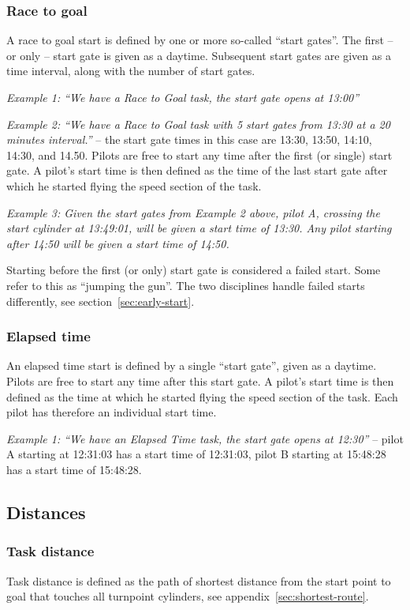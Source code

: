 \documentclass{article}
\begin{document}
\subsubsection{Race to goal}
A race to goal start is defined by one or more so-called “start gates”. The
first – or only – start gate is given as a daytime. Subsequent start gates are
given as a time interval, along with the number of start gates.

\textit{Example 1: “We have a Race to Goal task, the start gate opens at 13:00”}

\textit{Example 2: “We have a Race to Goal task with 5 start gates from 13:30 at a 20
minutes interval.”} – the start gate times in this case are 13:30, 13:50, 14:10,
14:30, and 14.50.  Pilots are free to start any time after the first (or
single) start gate. A pilot’s start time is then defined as the time of the
last start gate after which he started flying the speed section of the task.

\textit{Example 3: Given the start gates from Example 2 above, pilot A, crossing the
start cylinder at 13:49:01, will be given a start time of 13:30. Any pilot
starting after 14:50 will be given a start time of 14:50.}

Starting before the first (or only) start gate is considered a failed start.
Some refer to this as “jumping the gun”. The two disciplines handle failed
starts differently, see section~\ref{sec:early-start}.

\subsubsection{Elapsed time}
An elapsed time start is defined by a single “start gate”, given as a daytime.
Pilots are free to start any time after this start gate. A pilot’s start time
is then defined as the time at which he started flying the speed section of the
task. Each pilot has therefore an individual start time.

\textit{Example 1: “We have an Elapsed Time task, the start gate opens at 12:30”}
– pilot A starting at 12:31:03 has a start time of 12:31:03, pilot B starting
at 15:48:28 has a start time of 15:48:28.

\subsection{Distances}
\subsubsection{Task distance}
\label{sec:task-distance}
Task distance is defined as the path of shortest distance from the start point
to goal that touches all turnpoint cylinders, see appendix~\ref{sec:shortest-route}.
\end{document}
